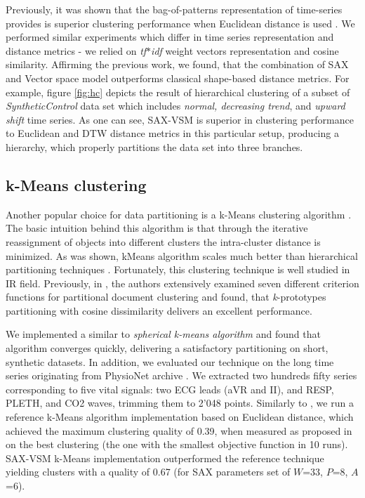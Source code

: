 \documentclass{llncs}
\begin{document}
Previously, it was shown that the bag-of-patterns representation of time-series
provides is superior clustering performance when Euclidean distance is used \cite{bag_patterns}. 
We performed similar experiments which differ in time series representation and distance
metrics - we relied on \textit{tf$\ast$idf} weight vectors representation and cosine similarity. 
Affirming the previous work, we found, that the combination of SAX and Vector space model
outperforms classical shape-based distance metrics. For example, figure \ref{fig:hc} depicts the
result of hierarchical clustering of a subset of \textit{SyntheticControl} data set which
includes \textit{normal, decreasing trend}, and \textit{upward shift} time series.
As one can see, SAX-VSM is superior in clustering performance to Euclidean and DTW distance 
metrics in this particular setup, producing a hierarchy, which properly partitions the data set 
into three branches.

\subsection{k-Means clustering} \label{trajectory}
Another popular choice for data partitioning is a k-Means clustering algorithm \cite{kmeans}.
The basic intuition behind this algorithm is that through the iterative reassignment of objects 
into different clusters the intra-cluster distance is minimized. As was shown, kMeans 
algorithm scales much better than hierarchical partitioning techniques \cite{kscale}.
Fortunately, this clustering technique is well studied in IR field. Previously, in \cite{zhao}, the
authors extensively examined seven different criterion functions for partitional document
clustering and found, that \textit{k}-prototypes partitioning with cosine dissimilarity delivers an
excellent performance. 

We implemented a similar to \cite{modha} \textit{spherical k-means algorithm} and found that
algorithm converges quickly, delivering a satisfactory partitioning on short, synthetic datasets. 
In addition, we evaluated our technique on the long time series originating from PhysioNet 
archive \cite{physionet}. 
We extracted two hundreds fifty series corresponding to five vital signals: two ECG leads 
(aVR and II), and RESP, PLETH, and CO2 waves, trimming them to 2'048 points. Similarly to
\cite{bag_patterns}, we run a reference k-Means algorithm implementation based on Euclidean
distance, which achieved the maximum clustering quality of 0.39, when measured as proposed in
\cite{kmetrics} on the best clustering (the one with the smallest objective function in 10 runs). 
SAX-VSM k-Means implementation outperformed the reference technique yielding clusters 
with a quality of 0.67 (for SAX parameters set of $W$=33, $P$=8, $A$=6).
\end{document}
